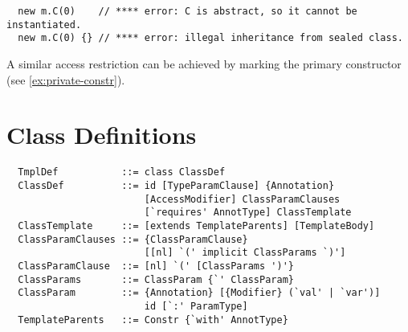 \begin{lstlisting}
  new m.C(0)    // **** error: C is abstract, so it cannot be instantiated.
  new m.C(0) {} // **** error: illegal inheritance from sealed class.
\end{lstlisting}

A similar access restriction can be achieved by marking the primary
constructor  (see \ref{ex:private-constr}).

\section{Class Definitions}
\label{sec:class-defs}

\syntax\begin{lstlisting} 
  TmplDef           ::= class ClassDef 
  ClassDef          ::= id [TypeParamClause] {Annotation} 
                        [AccessModifier] ClassParamClauses 
                        [`requires' AnnotType] ClassTemplate 
  ClassTemplate     ::= [extends TemplateParents] [TemplateBody]
  ClassParamClauses ::= {ClassParamClause} 
                        [[nl] `(' implicit ClassParams `)']
  ClassParamClause  ::= [nl] `(' [ClassParams ')'} 
  ClassParams       ::= ClassParam {`' ClassParam}
  ClassParam        ::= {Annotation} [{Modifier} (`val' | `var')] 
                        id [`:' ParamType]
  TemplateParents   ::= Constr {`with' AnnotType}
\end{lstlisting}

